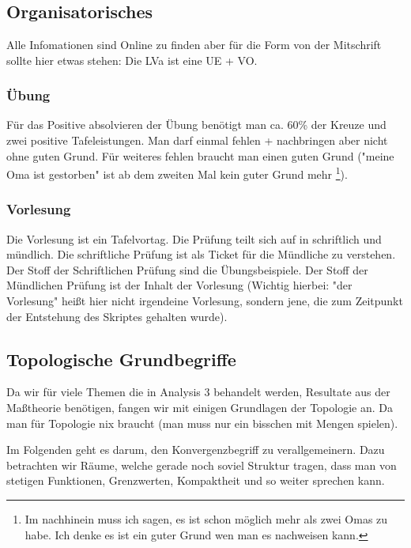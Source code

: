 \chapter{}
\section{Organisatorisches}
Alle Infomationen sind Online zu finden aber für die Form von der Mitschrift sollte hier etwas stehen:
Die LVa ist eine UE + VO. 
\subsection{Übung}
Für das Positive absolvieren der Übung benötigt man ca. 60\% der Kreuze und zwei positive Tafeleistungen.
Man darf einmal fehlen + nachbringen aber nicht ohne guten Grund.
Für weiteres fehlen braucht man einen guten Grund ("meine Oma ist gestorben"
ist ab dem zweiten Mal kein guter Grund mehr
\footnote{Im nachhinein muss ich sagen, es ist schon möglich mehr als zwei Omas zu habe.
 Ich denke es ist ein guter Grund wen man es nachweisen kann.}).
\subsection{Vorlesung}
Die Vorlesung ist ein Tafelvortag. 
Die Prüfung teilt sich auf in schriftlich und mündlich. Die schriftliche Prüfung ist als Ticket für die Mündliche zu verstehen.
Der Stoff der Schriftlichen Prüfung sind die Übungsbeispiele.
Der Stoff der Mündlichen Prüfung ist der Inhalt der Vorlesung (Wichtig hierbei: "der Vorlesung" heißt hier nicht irgendeine Vorlesung, sondern jene, die zum Zeitpunkt der Entstehung des Skriptes gehalten wurde).

\section{Topologische Grundbegriffe} 

Da wir für viele Themen die in Analysis 3 behandelt werden, Resultate aus der Maßtheorie benötigen,
fangen wir mit einigen Grundlagen der Topologie an. Da man für Topologie nix braucht (man muss nur ein bisschen mit Mengen spielen).

\bigskip

Im Folgenden geht es darum, den Konvergenzbegriff zu verallgemeinern. 
Dazu betrachten wir Räume, welche gerade noch soviel Struktur tragen, dass man von stetigen
Funktionen, Grenzwerten, Kompaktheit und so weiter sprechen kann.

